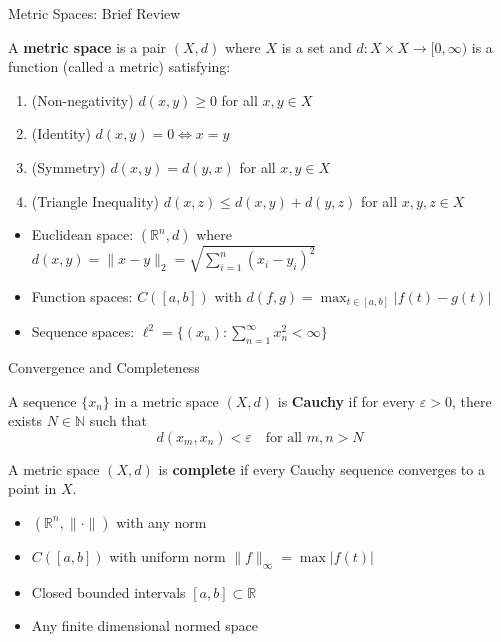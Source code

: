 \documentclass[aspectratio=169,10pt]{beamer}
\begin{document}
\begin{frame}{Metric Spaces: Brief Review}
    \begin{definition}
        A \textbf{metric space} is a pair $(X, d)$ where $X$ is a set and $d: X \times X \to [0, \infty)$ is a function (called a metric) satisfying:
        \begin{enumerate}
            \item (Non-negativity) $d(x,y) \geq 0$ for all $x, y \in X$
            \item (Identity) $d(x,y) = 0 \iff x = y$
            \item (Symmetry) $d(x,y) = d(y,x)$ for all $x, y \in X$
            \item (Triangle Inequality) $d(x,z) \leq d(x,y) + d(y,z)$ for all $x,y,z \in X$
        \end{enumerate}
    \end{definition}

    \begin{example}
        \begin{itemize}
            \item Euclidean space: $(\mathbb{R}^n, d)$ where $d(x,y) = \|x - y\|_2 = \sqrt{\sum_{i=1}^n (x_i - y_i)^2}$
            \item Function spaces: $C([a,b])$ with $d(f,g) = \max_{t \in [a,b]} |f(t) - g(t)|$
            \item Sequence spaces: $\ell^2 = \{(x_n) : \sum_{n=1}^\infty x_n^2 < \infty\}$
        \end{itemize}
    \end{example}
\end{frame}

\begin{frame}{Convergence and Completeness}
    \begin{definition}
        A sequence $\{x_n\}$ in a metric space $(X,d)$ is \textbf{Cauchy} if for every $\varepsilon > 0$, there exists $N \in \mathbb{N}$ such that
        \[
            d(x_m, x_n) < \varepsilon \quad \text{for all } m, n > N
        \]
    \end{definition}

    \begin{definition}
        A metric space $(X,d)$ is \textbf{complete} if every Cauchy sequence converges to a point in $X$.
    \end{definition}

    \vspace{0.3cm}
    \begin{example}
        \begin{itemize}
            \item $(\mathbb{R}^n, \|\cdot\|)$ with any norm
            \item $C([a,b])$ with uniform norm $\|f\|_\infty = \max |f(t)|$
            \item Closed bounded intervals $[a,b] \subset \mathbb{R}$
            \item Any finite dimensional normed space
        \end{itemize}
    \end{example}
\end{frame}
\end{document}
